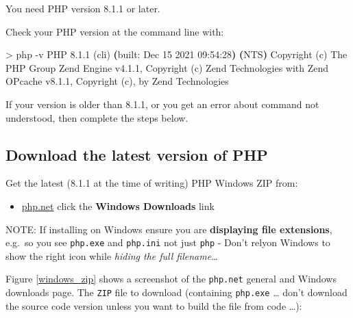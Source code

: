 \documentclass[a4paperpaper,openright]{book}
\newenvironment{Shaded}{}{}
\newcommand{\ExtensionTok}[1]{#1}
\newcommand{\KeywordTok}[1]{\textcolor[rgb]{0.00,0.44,0.13}{\textbf{#1}}}
\newcommand{\NormalTok}[1]{#1}
\newcommand{\OperatorTok}[1]{\textcolor[rgb]{0.40,0.40,0.40}{#1}}
\providecommand{\tightlist}{%
  \setlength{\itemsep}{0pt}\setlength{\parskip}{0pt}}
\begin{document}
You need PHP version 8.1.1 or later.

Check your PHP version at the command line with:

\begin{Shaded}
\begin{Highlighting}[]
   \OperatorTok{>} \ExtensionTok{php}\NormalTok{ -v}
   \ExtensionTok{PHP}\NormalTok{ 8.1.1 (cli) }\KeywordTok{(}\ExtensionTok{built}\NormalTok{: Dec 15 2021 09:54:28}\KeywordTok{)} \KeywordTok{(}\ExtensionTok{NTS}\KeywordTok{)}
   \ExtensionTok{Copyright}\NormalTok{ (c) }\ExtensionTok{The}\NormalTok{ PHP Group}
   \ExtensionTok{Zend}\NormalTok{ Engine v4.1.1, Copyright (c) }\ExtensionTok{Zend}\NormalTok{ Technologies}
       \ExtensionTok{with}\NormalTok{ Zend OPcache v8.1.1, Copyright (c), }\ExtensionTok{by}\NormalTok{ Zend Technologies}
\end{Highlighting}
\end{Shaded}

If your version is older than 8.1.1, or you get an error about command
not understood, then complete the steps below.

\hypertarget{download-the-latest-version-of-php}{%
\subsection{Download the latest version of
PHP}\label{download-the-latest-version-of-php}}

Get the latest (8.1.1 at the time of writing) PHP Windows ZIP from:

\begin{itemize}
\tightlist
\item
  \href{http://php.net/downloads.php}{php.net} click the \textbf{Windows
  Downloads} link
\end{itemize}

NOTE: If installing on Windows ensure you are \textbf{displaying file
extensions}, e.g.~so you see \texttt{php.exe} and \texttt{php.ini} not
just \texttt{php} - Don't relyon Windows to show the right icon while
\emph{hiding the full filename}\ldots{}

Figure \ref{windows_zip} shows a screenshot of the \texttt{php.net}
general and Windows downloads page. The \texttt{ZIP} file to download
(containing \texttt{php.exe} \ldots{} don't download the source code
version unless you want to build the file from code \ldots{}):
\end{document}
